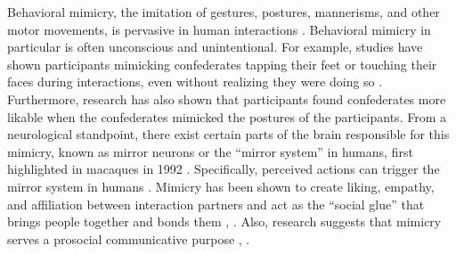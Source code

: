 \documentclass{acm_proc_article-sp}
\begin{document}
Behavioral mimicry, the imitation of gestures, postures, mannerisms, and other motor movements, is pervasive in human interactions \cite{chartrand2013antecedents}. Behavioral mimicry in particular is often unconscious and unintentional. For example, studies have shown participants mimicking confederates tapping their feet or touching their faces during interactions, even without realizing they were doing so \cite{chartrand1999chameleon}. Furthermore, research has also shown that participants found confederates more likable when the confederates mimicked the postures of the participants.
From a neurological standpoint, there exist certain parts of the brain responsible for this mimicry, known as mirror neurons or the ``mirror system'' in humans, first highlighted in macaques in 1992 \cite{ehrenfeld2011reflections}. Specifically, perceived actions can trigger the mirror system in humans \cite{chartrand1999chameleon}. Mimicry has been shown to create liking, empathy, and affiliation between interaction partners and act as the ``social glue'' that brings people together and bonds them \cite{chartrand2013antecedents}, \cite{lakin2003chameleon}. Also, research suggests that mimicry serves a prosocial communicative purpose \cite{bavelas1986show}, \cite{chartrand2013antecedents}.
\end{document}
